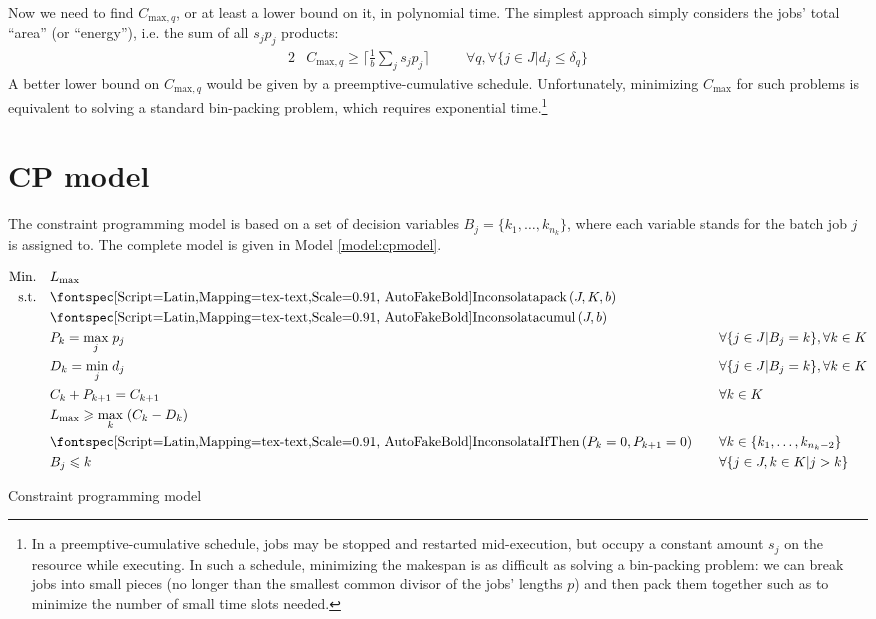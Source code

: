 \documentclass[13pt, letterpaper, oneside]{book}
\begin{document}
Now we need to find $C_{\text{max},q}$, or at least a lower bound on it, in
polynomial time. The simplest approach simply considers the jobs' total ``area''
(or ``energy''), i.e. the sum of all $s_j p_j$ products:
\begin{alignat}{2}
& C_{\text{max},q} \geq \big\lceil\frac{1}{b} \sum_{j} s_j
p_j\big\rceil \quad
&& \forall q, \forall \{ j \in J | d_j \leq \delta_q \}
\end{alignat}
A better lower bound on $C_{\text{max},q}$ would be given by a
preemptive-cumulative schedule. Unfortunately, minimizing $C_{\text{max}}$ for
such problems is equivalent to solving a standard bin-packing problem, which
requires exponential time.\footnote{In a preemptive-cumulative schedule, jobs
may be stopped and restarted mid-execution, but occupy a constant amount $s_j$
on the resource while executing. In such a schedule, minimizing the makespan is
as difficult as solving a bin-packing problem: we can break jobs into small
pieces (no longer than the smallest common divisor of the jobs' lengths $p$) and
then pack them together such as to minimize the number of small time slots
needed.}

\section{CP model}\label{sec:cpmodel}
The constraint programming model is based on a set of decision variables $B_j =
\{k_1, \dots, k_{n_k} \}$, where each variable stands for the batch job $j$ is
assigned to. The complete model is given in Model \ref{model:cpmodel}.
\begin{model}
\begin{alignat}{2}
\mathrm{Min.}\quad & \Lmax && \\
\mathrm{s.t.}\quad & \label{cpcs:pack} \mathtt{pack}(J, K, b) && \\
& \label{cpcs:cumul} \mathtt{cumul}(J, b) && \\
& \label{cpcs:pk} P_k = \underset{j}{\max} \; p_j \quad && \forall \{j \in J
| B_j = k\}, \forall k \in K \\
& \label{cpcs:dk} D_k = \underset{j}{\min} \; d_j \quad && \forall \{j \in J
| B_j = k\}, \forall k \in K \\
& \label{cpcs:ck} C_k + P_{k+1} = C_{k+1} \quad && \forall k \in K \\
& \label{cpcs:lmax} \Lmax \geq \underset{k}{\max} \; (C_k - D_k) && \\
& \label{cpcs:empty} \mathtt{IfThen}(P_k = 0, P_{k+1} = 0) \quad && \forall k
\in \{ k_1, \dots, k_{n_k - 2}\} \\
& \label{cpcs:pp} B_j \leq k \quad && \forall \{ j \in J, k \in K | j > k \}
\end{alignat}
\caption{Constraint programming model}
\label{model:cpmodel}
\end{model}
\end{document}
